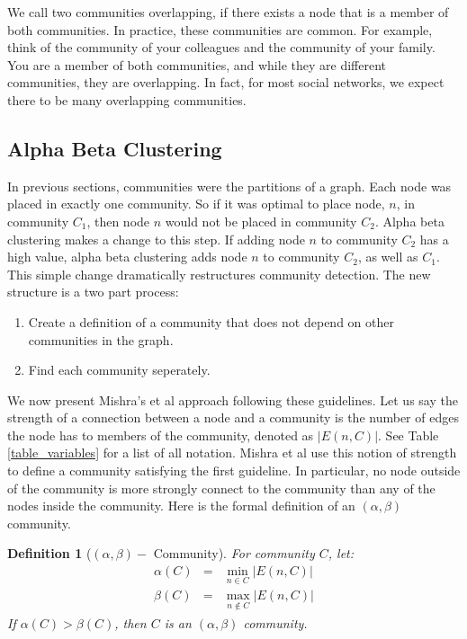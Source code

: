 \documentclass[phd,tocprelim]{cornell}
\newtheorem{definition}{Definition}
\begin{document}
We call two communities overlapping, if there exists a node that is a member of both communities.  In practice, these communities are common.  For example, think of the community of your colleagues and the community of your family. You are a member of both communities, and while they are different communities, they are overlapping.  In fact, for most social networks, we expect there to be many overlapping communities.


\subsection{Alpha Beta Clustering}

In previous sections, communities were the partitions of a graph.  Each node was placed in exactly one community.  So if it was optimal to place node, $n$, in community $C_1$, then node $n$ would not be placed in community $C_2$.  Alpha beta clustering makes a change to this step.  If adding node $n$ to community $C_2$ has a high value, alpha beta clustering adds node $n$ to community $C_2$, as well as $C_1$.  This simple change dramatically restructures community detection.  The new structure is a two part process:
\begin{enumerate}
\item Create a definition of a community that does not depend on other communities in the graph.
\item Find each community seperately.
\end{enumerate}

We now present Mishra's et al \cite{mishra} approach following these guidelines.  Let us say the strength of a connection between a node and a community is the number of edges the node has to members of the community, denoted as $|E(n, C)|$.  See Table \ref{table_variables} for a list of all notation. Mishra et al \cite{mishra} use this notion of strength to define a community satisfying the first guideline.  In particular, no node outside of the community is more strongly connect to the community than any of the nodes inside the community.  Here is the formal definition of an $(\alpha, \beta)$ community.
\begin{definition}[$(\alpha, \beta) - $ Community]
For community $C$, let:
\begin{eqnarray*}
\alpha(C) &=& \min\limits_{n \in C} |E(n, C)|\\
\beta(C) &=& \max\limits_{n \notin C} |E(n, C)|
\end{eqnarray*}
If $\alpha(C) > \beta(C)$, then $C$ is an $(\alpha, \beta)$ community.
\end{definition}
\end{document}
